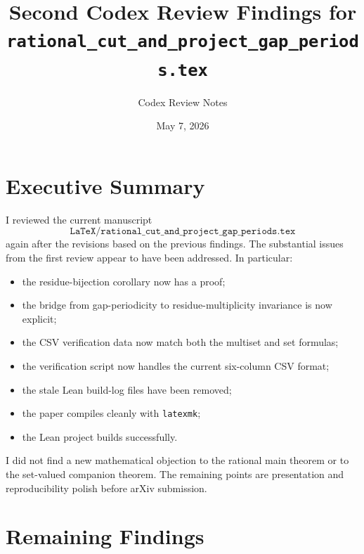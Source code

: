 \documentclass[11pt]{article}
\title{Second Codex Review Findings for\\
\texttt{rational\_cut\_and\_project\_gap\_periods.tex}}
\author{Codex Review Notes}
\date{May 7, 2026}
\begin{document}
\maketitle

\section*{Executive Summary}

I reviewed the current manuscript
\[
\texttt{LaTeX/rational\_cut\_and\_project\_gap\_periods.tex}
\]
again after the revisions based on the previous findings.  The substantial
issues from the first review appear to have been addressed.  In particular:

\begin{itemize}[leftmargin=*]
  \item the residue-bijection corollary now has a proof;
  \item the bridge from gap-periodicity to residue-multiplicity invariance is
        now explicit;
  \item the CSV verification data now match both the multiset and set formulas;
  \item the verification script now handles the current six-column CSV format;
  \item the stale Lean build-log files have been removed;
  \item the paper compiles cleanly with \texttt{latexmk};
  \item the Lean project builds successfully.
\end{itemize}

I did not find a new mathematical objection to the rational main theorem or to
the set-valued companion theorem.  The remaining points are presentation and
reproducibility polish before arXiv submission.

\section*{Remaining Findings}
\end{document}
